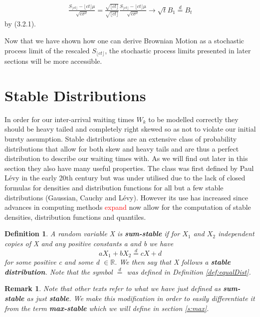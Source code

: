 \documentclass[honours,12pt]{UNSWthesis}
\newcommand{\R}{\mathbb{R}}
\newcommand{\1}{\mathbf 1}
\newtheorem{definition}[theorem]{Definition}
\newtheorem{remark}[theorem]{Remark}
\numberwithin{equation}{section}
\theoremstyle{definition}
\theoremstyle{remark}
\begin{document}

\begin{align*}
\frac{S_{\lfloor ct \rfloor} - \lfloor ct \rfloor\mu}{\sqrt{c \sigma^2}}
= \frac{\sqrt{\lfloor ct \rfloor}}{\sqrt{\lfloor ct \rfloor}}
\frac{S_{\lfloor ct \rfloor} - \lfloor ct \rfloor\mu}{\sqrt{c \sigma^2}}
\to \sqrt t B_1 \stackrel{d}{=} B_t
\end{align*}
by (3.2.1). 


Now that we have shown how one can derive Brownian Motion as a stochastic process limit of the rescaled $S_{\lfloor ct\rfloor}$, the stochastic process limits presented in later sections will be more accessible.


\section{Stable Distributions}
In order for our inter-arrival waiting times $W_k$ to be modelled correctly they should be heavy tailed and completely right skewed so as not to violate our initial bursty assumption.
Stable distributions are an extensive class of probability distributions that allow for both skew and heavy tails and are thus a perfect distribution to describe our waiting times with. As we will find out later in this section they also have many useful properties. The class was first defined by Paul L\'{e}vy in the early 20th century but was under utilised due to the lack of closed formulas for densities and distribution functions for all but a few stable distributions (Gaussian, Cauchy and L\'{e}vy). However its use has increased since advances in computing methods \textcolor{red}{expand} now allow for the computation of stable densities, distribution functions and quantiles.\\
\begin{definition}\cite{Nolan2015}
A random variable X is \textbf{sum-stable} if for $X_1$ and $X_2$ independent copies of X and any positive constants a and b we have
\[
	aX_1+bX_2\overset{d}{=}cX+d
\]
for some positive c and some d $\in\R.$ We then say that X follows a \textbf{stable distribution}. Note that the symbol $\overset{d}{=}$ was defined in Definition \ref{def:equalDist}.\\
\end{definition}
\begin{remark}
Note that other texts refer to what we have just defined as \textbf{sum-stable} as just \textbf{stable}. We make this modification in order to easily differentiate it from the term \textbf{max-stable} which we will define in section \ref{s:max}.\\
\end{remark}
\end{document}
